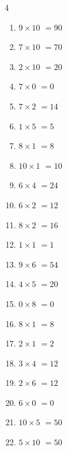 \begin{multicols}{4}
\begin{enumerate}
  \item $9\times 10$
        $=90$

  \item $7\times 10$
        $=70$

  \item $2\times 10$
        $=20$

  \item $7\times 0$
        $=0$

  \item $7\times 2$
        $=14$

  \item $1\times 5$
        $=5$

  \item $8\times 1$
        $=8$

  \item $10\times 1$
        $=10$

  \item $6\times 4$
        $=24$

  \item $6\times 2$
        $=12$

  \item $8\times 2$
        $=16$

  \item $1\times 1$
        $=1$

  \item $9\times 6$
        $=54$

  \item $4\times 5$
        $=20$

\columnbreak %

\resetques

  \item $0\times 8$
        $=0$

  \item $8\times 1$
        $=8$

  \item $2\times 1$
        $=2$

  \item $3\times 4$
        $=12$

  \item $2\times 6$
        $=12$

  \item $6\times 0$
        $=0$

  \item $10\times 5$
        $=50$

  \item $5\times 10$
        $=50$


\end{enumerate}
\end{multicols}
